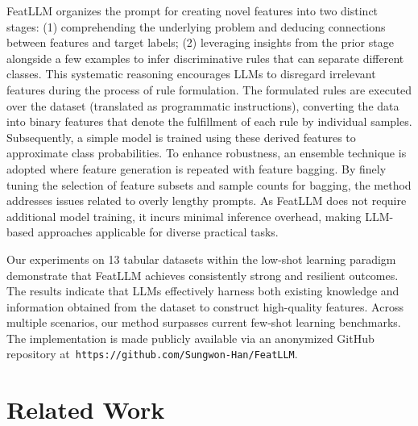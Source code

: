 \textsf{FeatLLM} organizes the prompt for creating novel features into two distinct stages: (1) comprehending the underlying problem and deducing connections between features and target labels; (2) leveraging insights from the prior stage alongside a few examples to infer discriminative rules that can separate different classes. This systematic reasoning encourages LLMs to disregard irrelevant features during the process of rule formulation. The formulated rules are executed over the dataset (translated as programmatic instructions), converting the data into binary features that denote the fulfillment of each rule by individual samples. Subsequently, a simple model is trained using these derived features to approximate class probabilities. To enhance robustness, an ensemble technique is adopted where feature generation is repeated with feature bagging. By finely tuning the selection of feature subsets and sample counts for bagging, the method addresses issues related to overly lengthy prompts. As \textsf{FeatLLM} does not require additional model training, it incurs minimal inference overhead, making LLM-based approaches applicable for diverse practical tasks.

Our experiments on 13 tabular datasets within the low-shot learning paradigm demonstrate that \textsf{FeatLLM} achieves consistently strong and resilient outcomes. The results indicate that LLMs effectively harness both existing knowledge and information obtained from the dataset to construct high-quality features. Across multiple scenarios, our method surpasses current few-shot learning benchmarks. The implementation is made publicly available via an anonymized GitHub repository at~\texttt{https://github.com/Sungwon-Han/FeatLLM}.

\section{Related Work}

